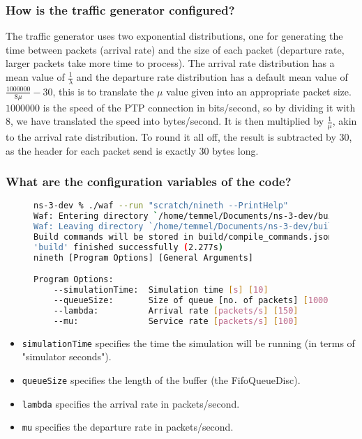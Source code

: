 \documentclass[a4paper, titlepage,12pt]{article}
\begin{document}
		\subsubsection*{How is the traffic generator configured?}

			The traffic generator uses two exponential distributions, one for generating the time between packets (arrival rate) and the size of each packet (departure rate, larger packets take more time to process). The arrival rate distribution has a mean value of $\frac{1}{\lambda}$ and the departure rate distribution has a default mean value of $\frac{1000000}{8\mu}-30$, this is to translate the $\mu$ value given into an appropriate packet size. $1000000$ is the speed of the PTP connection in bits/second, so by dividing it with $8$, we have translated the speed into bytes/second. It is then multiplied by $\frac{1}{\mu}$, akin to the arrival rate distribution. To round it all off, the result is subtracted by $30$, as the header for each packet send is exactly $30$ bytes long.

		\subsubsection*{What are the configuration variables of the code?}

		\begin{figure}[h!]
			\begin{lstlisting}[language=sh]
ns-3-dev % ./waf --run "scratch/nineth --PrintHelp"
Waf: Entering directory `/home/temmel/Documents/ns-3-dev/build'
Waf: Leaving directory `/home/temmel/Documents/ns-3-dev/build'
Build commands will be stored in build/compile_commands.json
'build' finished successfully (2.277s)
nineth [Program Options] [General Arguments]

Program Options:
    --simulationTime:  Simulation time [s] [10]
    --queueSize:       Size of queue [no. of packets] [1000]
    --lambda:          Arrival rate [packets/s] [150]
    --mu:              Service rate [packets/s] [100]
			\end{lstlisting}
		\end{figure}

		\begin{itemize}
				\item \verb|simulationTime| specifies the time the simulation will be running (in terms of "simulator seconds").
				\item \verb|queueSize| specifies the length of the buffer (the FifoQueueDisc).
				\item \verb|lambda| specifies the arrival rate in packets/second.
				\item \verb|mu| specifies the departure rate in packets/second.
		\end{itemize}
\end{document}
